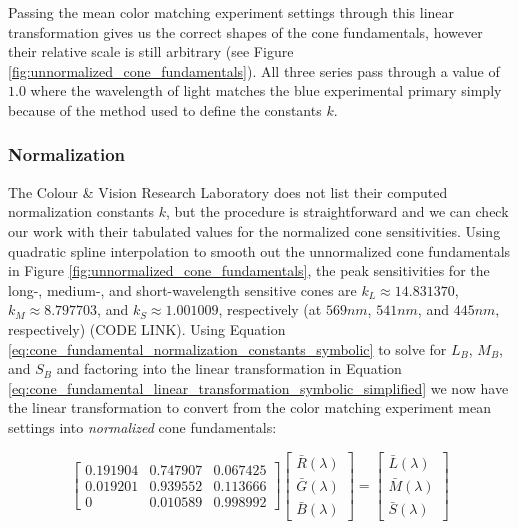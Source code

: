\documentclass{article}
\begin{document}
\begin{multicols}{2}
Passing the mean color matching experiment settings through this linear transformation gives us the correct shapes of the cone fundamentals, however their relative scale is still arbitrary (see Figure \ref{fig:unnormalized_cone_fundamentals}).  All three series pass through a value of $1.0$ where the wavelength of light matches the blue experimental primary simply because of the method used to define the constants $k$.

\subsubsection{Normalization} %

The Colour \& Vision Research Laboratory does not list their computed normalization constants $k$, but the procedure is straightforward and we can check our work with their tabulated values for the normalized cone sensitivities.  Using quadratic spline interpolation to smooth out the unnormalized cone fundamentals in Figure \ref{fig:unnormalized_cone_fundamentals}, the peak sensitivities for the long-, medium-, and short-wavelength sensitive cones are $k_L\approx14.831370$, $k_M\approx8.797703$, and $k_S\approx1.001009$, respectively (at $569 nm$, $541 nm$, and $445 nm$, respectively) (CODE LINK).  Using Equation \ref{eq:cone_fundamental_normalization_constants_symbolic} to solve for $L_B$, $M_B$, and $S_B$ and factoring into the linear transformation in Equation \ref{eq:cone_fundamental_linear_transformation_symbolic_simplified} we now have the linear transformation to convert from the color matching experiment mean settings into \textit{normalized} cone fundamentals:

\begin{equation} %
    \begin{bmatrix}
        0.191904&0.747907&0.067425\\
        0.019201&0.939552&0.113666\\
        0&0.010589&0.998992
    \end{bmatrix}\begin{bmatrix}
        \bar{R}(\lambda)\\
        \bar{G}(\lambda)\\
        \bar{B}(\lambda)
    \end{bmatrix}=\begin{bmatrix}
        \bar{L}(\lambda)\\
        \bar{M}(\lambda)\\
        \bar{S}(\lambda)
    \end{bmatrix}
\end{equation}


\end{multicols}
\end{document}
